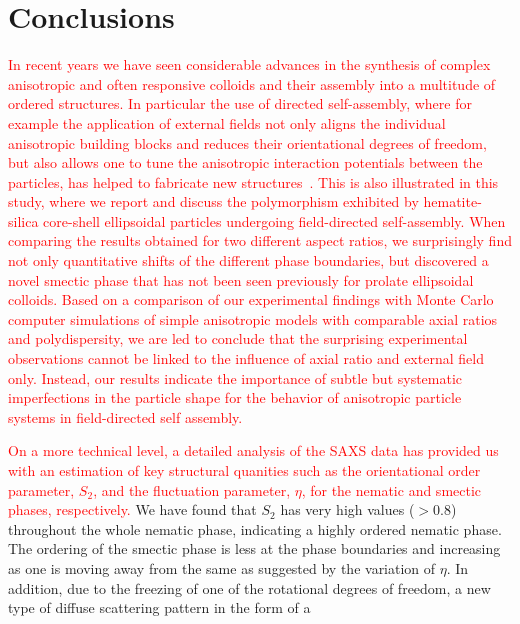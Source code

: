 \documentclass[aps,prl,preprint,superscriptaddress]{revtex4-1} %
\begin{document}
\section*{Conclusions}
\textcolor{red}{In recent years we have seen considerable advances in the synthesis of complex anisotropic and often responsive colloids and their assembly into a multitude of ordered structures. In particular the use of directed self-assembly, where for example the application of external fields not only aligns the individual anisotropic building blocks and reduces their orientational degrees of freedom, but also allows one to tune the anisotropic interaction potentials between the particles, has helped to fabricate new structures~\cite{Schurtenberger2016}. This is also illustrated in this study, where we report and discuss the polymorphism exhibited by hematite-silica core-shell ellipsoidal particles undergoing field-directed self-assembly. When comparing the results obtained for two different aspect ratios, we surprisingly find not only quantitative shifts of the different phase boundaries, but discovered a novel smectic phase that has not been seen previously for prolate ellipsoidal colloids. Based on a comparison of our experimental findings with Monte Carlo computer simulations of simple anisotropic models with comparable axial ratios and polydispersity, we are led to conclude that the surprising experimental observations cannot be linked to the influence of axial ratio and external field only. Instead, {\color{green}our results} indicate the importance of subtle but systematic imperfections in the particle shape for the behavior of anisotropic particle systems in field-directed self assembly.}\par
\textcolor{red}{On a more technical level, a detailed analysis of the SAXS data has provided us with an estimation of
  key structural quanities such as the orientational order parameter, $S_2$, and the fluctuation parameter, $\eta$, for
the nematic and smectic phases, respectively.} We have found that $S_2$ has very high values ($>0.8$) throughout the
whole nematic phase, indicating a highly ordered nematic phase. The ordering of the smectic phase is less at the phase
boundaries and increasing as one is moving away from the same as suggested by the variation of $\eta$. In addition, due
to the freezing of one of the rotational degrees of freedom, a new type of diffuse scattering pattern in the form of a
\end{document}
